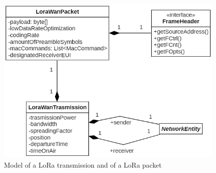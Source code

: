 \begin{figure}[h]
    \centering
    \includegraphics[scale=0.9]{images/loraDing.png}
    \caption{Model of a LoRa transmission and of a LoRa packet}
    \label{fig:loraDing}
\end{figure}